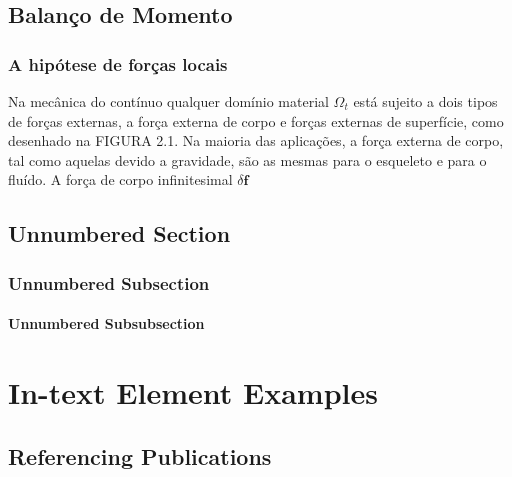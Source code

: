 \documentclass[
	11pt, %
	fleqn, %
	a4paper, %
]{LegrandOrangeBook}
\begin{document}
\section{Balanço de Momento}

\newcommand{\fl}{\textbf{f}}

\subsection{A hipótese de forças locais}

Na mecânica do contínuo qualquer domínio material $\Omega_t$ está sujeito a dois tipos de forças externas, a força externa de corpo e forças externas de superfície, como desenhado na FIGURA 2.1. Na maioria das aplicações, a força externa de corpo, tal como aquelas devido a gravidade, são as mesmas para o esqueleto e para o fluído. A força de corpo infinitesimal $\delta \fl$



\newpage


\section*{Unnumbered Section}

\subsection*{Unnumbered Subsection}

\subsubsection*{Unnumbered Subsubsection}


\chapter{In-text Element Examples}

\section{Referencing Publications}
\end{document}
